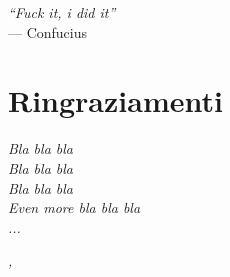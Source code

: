 
\cleardoublepage
{}
{}

\begin{flushright}{
	\slshape    
	``Fuck it, i did it''} \\ 
	\medskip
    --- Confucius
\end{flushright}


\bigskip

\begingroup
\let\clearpage\relax
\let\cleardoublepage\relax
\let\cleardoublepage\relax

\chapter*{Ringraziamenti}

\noindent \textit{Bla bla bla}\\

\noindent \textit{Bla bla bla}\\

\noindent \textit{Bla bla bla}\\

\noindent \textit{Even more bla bla bla}\\

\noindent \textit{...}\\

\bigskip

\noindent\textit{\myLocation, \myTime}
\hfill \myName

\endgroup

